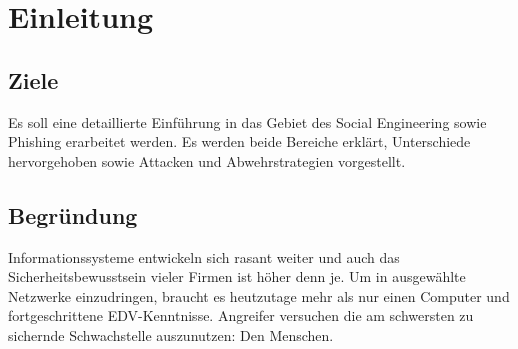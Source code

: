 \chapter{Einleitung}

\section{Ziele}
Es soll eine detaillierte Einführung in das Gebiet des Social Engineering sowie Phishing erarbeitet werden.
Es werden beide Bereiche erklärt, Unterschiede hervorgehoben sowie Attacken und Abwehrstrategien vorgestellt.

\section{Begründung}
Informationssysteme entwickeln sich rasant weiter und auch das Sicherheitsbewusstsein vieler Firmen ist höher denn je. Um in ausgewählte Netzwerke einzudringen, braucht es heutzutage mehr als nur einen Computer und fortgeschrittene EDV-Kenntnisse. Angreifer versuchen die am schwersten zu sichernde Schwachstelle auszunutzen: Den Menschen.
